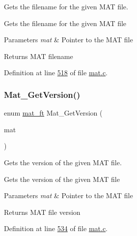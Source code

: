 Gets the filename for the given M\+AT file. 

Gets the filename for the given M\+AT file


\begin{DoxyParams}{Parameters}
{\em mat} & Pointer to the M\+AT file \\
\hline
\end{DoxyParams}
\begin{DoxyReturn}{Returns}
M\+AT filename 
\end{DoxyReturn}


Definition at line \hyperlink{mat_8c_source_l00518}{518} of file \hyperlink{mat_8c_source}{mat.\+c}.

\mbox{\label{group___m_a_t_gabef04e2a55e78b0f7d9b2ddc5f42d03c}} 
\subsubsection{\texorpdfstring{Mat\+\_\+\+Get\+Version()}{Mat\_GetVersion()}}
{\footnotesize\ttfamily enum \hyperlink{group___m_a_t_gad03442b8378999189d510e3745c702b7}{mat\+\_\+ft} Mat\+\_\+\+Get\+Version (\begin{DoxyParamCaption}\item[{\hyperlink{group___m_a_t_gab0fc888f5a5d79943b16284b1f91c2e8}{mat\+\_\+t} $\ast$}]{mat }\end{DoxyParamCaption})}



Gets the version of the given M\+AT file. 

Gets the version of the given M\+AT file


\begin{DoxyParams}{Parameters}
{\em mat} & Pointer to the M\+AT file \\
\hline
\end{DoxyParams}
\begin{DoxyReturn}{Returns}
M\+AT file version 
\end{DoxyReturn}


Definition at line \hyperlink{mat_8c_source_l00534}{534} of file \hyperlink{mat_8c_source}{mat.\+c}.

\mbox{\label{group___m_a_t_gafbfedb5636a99f0ef867520c47f77d18}} 
